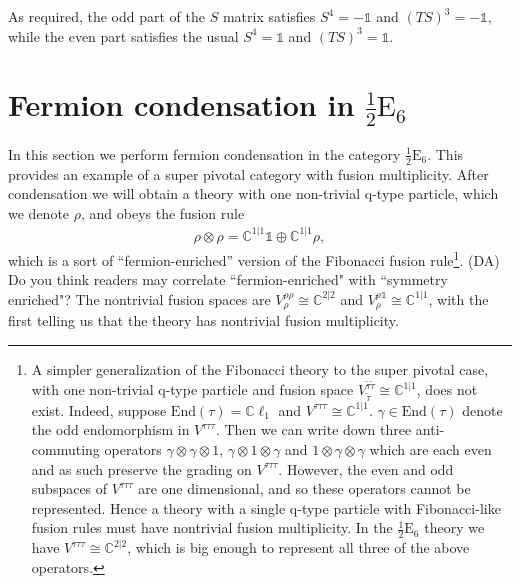 \documentclass[12pt,a4paper]{article}
\newcommand{\tp}{\otimes}
\newcommand{\unit}{\mathds{1}}
\newcommand{\cc}{\mathbb{C}}
\newcommand{\dave}[1]{{\color{ao(english)}\footnotesize{(DA) #1}}}
\newcommand{\kw}[1]{{\color{kwcolor}\footnotesize{(KW) #1}}}
\newcommand{\halfesix}{\frac{1}{2}\text{E}_6}
\begin{document}
As required, the odd part of the $S$ matrix satisfies $S^4 = -\unit$ and $(TS)^3 = -\unit$, while the even part satisfies the usual $S^4 = \unit$ and $(TS)^3 = \unit$. 



\section{Fermion condensation in $\halfesix$} \label{halfesix}

In this section we perform fermion condensation in the category $\halfesix$.
This provides an example of a super pivotal category with fusion multiplicity.
After condensation we will obtain a theory with one non-trivial q-type particle, 
which we denote $\rho$, and obeys the fusion rule
\begin{align}
\rho \tp \rho = \mathbb{C}^{1|1} \mathds{1} \oplus \mathbb{C}^{1|1} \rho,
\end{align}
which is a sort of ``fermion-enriched'' version of the Fibonacci fusion rule\footnote{A simpler generalization of the Fibonacci theory to the super pivotal case, with one non-trivial q-type particle and fusion space $V^{\tilde{\tau} \tilde{\tau}}_{\tilde {\tau}}\cong \mathbb{C}^{1|1}$, does not exist. Indeed, suppose $\text{End}(\tau) = \mathbb{C} \ell_1$ and $V^{\tau \tau \tau} \cong \mathbb{C}^{1|1}$.
$\gamma \in \text{End}(\tau)$ denote the odd endomorphism in $V^{\tau\tau\tau}$.
Then we can write down three anti-commuting operators $\gamma \tp \gamma \tp 1$, $\gamma \tp 1 \tp \gamma$ and $1\tp \gamma \tp \gamma$ which are each even and as such preserve the grading on $V^{\tau\tau\tau}$. 
However, the even and odd subspaces of $V^{\tau\tau\tau}$ are one dimensional, and so these operators cannot be represented.
Hence a theory with a single q-type particle with Fibonacci-like fusion rules must have nontrivial fusion multiplicity.
In the $\halfesix$ theory we have $V^{\tau\tau\tau} \cong \cc^{2|2}$, which is big enough to represent all three of the above operators.}.
\dave{Do you think readers may correlate ``fermion-enriched" with ``symmetry enriched"?}
The nontrivial fusion spaces are $V^{\rho\rho}_\rho \cong \cc^{2|2}$ and $V^{\rho\unit}_\rho \cong \cc^{1|1}$, with the first telling us that the theory has nontrivial fusion multiplicity. 
\end{document}
